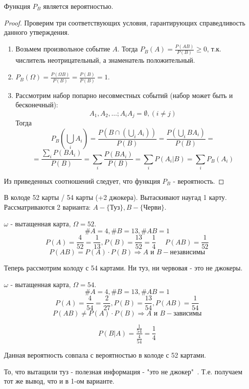 \begin{theorem}
	Функция $P_B$ является вероятностью.
	\begin{proof}
		Проверим три соответствующих условия, гарантирующих справедливость данного утверждения.
		\begin{enumerate}
			\item Возьмем произвольное событие $A$. Тогда $P_B(A) = \frac{P(AB)}{P(B)} \ge 0$, т.к. числитель неотрицательный, а знаменатель положительный.
			\item $P_B (\Omega) = \frac{P(\Omega B)}{P(B)} = \frac{P(B)}{P(B)} = 1$.
			\item Рассмотрим набор попарно несовместных событий (набор может быть и бесконечный):
			\[A_1, A_2, \dots; A_i A_j = \emptyset, (i \ne j) \]
			Тогда
			\[ P_B \left(\bigcup\limits_i A_i\right) = \frac{P \left( B \cap \left( \bigcup\limits_i A_i \right) \right)}{P(B)} = \frac{P \left( \bigcup\limits_i BA_i \right)}{P(B)} = \]
			\[ = \frac{\sum\limits_{i} P(BA_i)}{P(B)} = \sum_{i} \frac{P(BA_i)}{P(B)} = \sum_{i} P(A_i | B) = \sum_{i} P_B(A_i) \]
		\end{enumerate}
		Из приведенных соотношений следует, что функция $P_B$ - вероятность.
	\end{proof}
\end{theorem}

\begin{exmp}
	В колоде 52 карты / 54 карты (+2 джокера). Вытаскивают наугад 1 карту. Рассматриваются 2 варианта: $A - \{ \text{Туз} \}, B - \{ \text{Черви} \}$.
	
	$\omega$ - вытащенная карта, $\Omega = 52$.
	\[ \# A = 4, \# B = 13, \# AB = 1 \]
	\[ P(A) = \dfrac{4}{52} = \dfrac{1}{13}, P(B) = \dfrac{13}{52} = \dfrac{1}{4} ~~~~~~ P(AB) = \dfrac{1}{52} \]
	\[ P(AB) = P(A) \cdot P(B) \Rightarrow A \text{ и } B - \text{независимы} \]
	
	Теперь рассмотрим колоду с 54 картами. Ни туз, ни червовая - это не джокеры.
	
	$\omega$ - вытащенная карта, $\Omega = 54$.
	\[ \# A = 4, \# B = 13, \# AB = 1 \]
	\[ P(A) = \dfrac{4}{54} = \dfrac{2}{27}, P(B) = \dfrac{13}{54}, P(AB) = \dfrac{1}{54} \]
	\[ P(AB) \ne P(A) \cdot P(B) \Rightarrow A \text{ и } B - \text{зависимы} \]
	
	\[ P(B|A) = \dfrac{\frac{1}{54}}{\frac{4}{54}} = \dfrac{1}{4} \]
	
	Данная вероятность совпала с вероятностью в колоде с 52 картами.
	
	То, что вытащили туз - полезная информация - "это не джокер"\ . Т.е. получаем тот же вывод, что и в 1-ом варианте.
\end{exmp}

